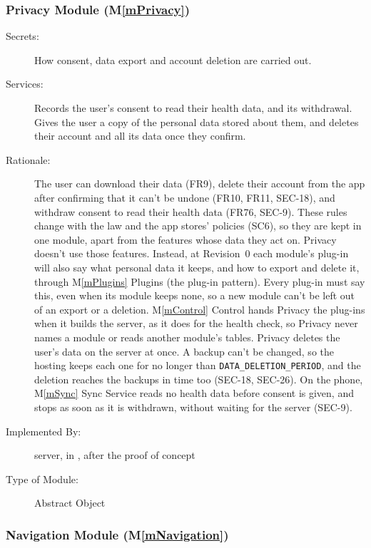 \documentclass[12pt, titlepage]{article}
\newcommand{\mref}[1]{M\ref{#1}}
\begin{document}
\subsubsection{Privacy Module (\mref{mPrivacy})}

\begin{description}
\item[Secrets:] How consent, data export and account deletion are carried out.
\item[Services:] Records the user's consent to read their health data, and its withdrawal. Gives the user a copy of the personal data stored about them, and deletes their account and all its data once they confirm.
\item[Rationale:] The user can download their data (FR9), delete their account from the app after confirming that it can't be undone (FR10, FR11, SEC-18), and withdraw consent to read their health data (FR76, SEC-9). These rules change with the law and the app stores' policies (SC6), so they are kept in one module, apart from the features whose data they act on. Privacy doesn't use those features. Instead, at Revision~0 each module's plug-in will also say what personal data it keeps, and how to export and delete it, through \mref{mPlugins} Plugins (the plug-in pattern). Every plug-in must say this, even when its module keeps none, so a new module can't be left out of an export or a deletion. \mref{mControl} Control hands Privacy the plug-ins when it builds the server, as it does for the health check, so Privacy never names a module or reads another module's tables. Privacy deletes the user's data on the server at once. A backup can't be changed, so the hosting keeps each one for no longer than \texttt{DATA\_DELETION\_PERIOD}, and the deletion reaches the backups in time too (SEC-18, SEC-26). On the phone, \mref{mSync} Sync Service reads no health data before consent is given, and stops as soon as it is withdrawn, without waiting for the server (SEC-9).
\item[Implemented By:] \progname{} server, in , after the proof of concept
\item[Type of Module:] Abstract Object
\end{description}



\subsubsection{Navigation Module (\mref{mNavigation})}
\end{document}
